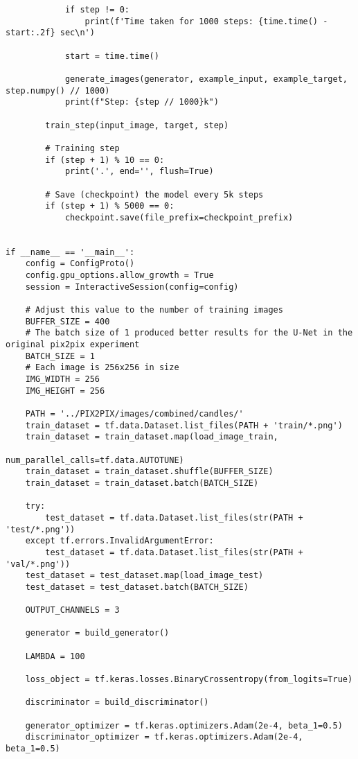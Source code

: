 \begin{lstlisting}
            if step != 0:
                print(f'Time taken for 1000 steps: {time.time() - start:.2f} sec\n')

            start = time.time()

            generate_images(generator, example_input, example_target, step.numpy() // 1000)
            print(f"Step: {step // 1000}k")

        train_step(input_image, target, step)

        # Training step
        if (step + 1) % 10 == 0:
            print('.', end='', flush=True)

        # Save (checkpoint) the model every 5k steps
        if (step + 1) % 5000 == 0:
            checkpoint.save(file_prefix=checkpoint_prefix)


if __name__ == '__main__':
    config = ConfigProto()
    config.gpu_options.allow_growth = True
    session = InteractiveSession(config=config)

    # Adjust this value to the number of training images
    BUFFER_SIZE = 400
    # The batch size of 1 produced better results for the U-Net in the original pix2pix experiment
    BATCH_SIZE = 1
    # Each image is 256x256 in size
    IMG_WIDTH = 256
    IMG_HEIGHT = 256

    PATH = '../PIX2PIX/images/combined/candles/'
    train_dataset = tf.data.Dataset.list_files(PATH + 'train/*.png')
    train_dataset = train_dataset.map(load_image_train,
                                      num_parallel_calls=tf.data.AUTOTUNE)
    train_dataset = train_dataset.shuffle(BUFFER_SIZE)
    train_dataset = train_dataset.batch(BATCH_SIZE)

    try:
        test_dataset = tf.data.Dataset.list_files(str(PATH + 'test/*.png'))
    except tf.errors.InvalidArgumentError:
        test_dataset = tf.data.Dataset.list_files(str(PATH + 'val/*.png'))
    test_dataset = test_dataset.map(load_image_test)
    test_dataset = test_dataset.batch(BATCH_SIZE)

    OUTPUT_CHANNELS = 3

    generator = build_generator()

    LAMBDA = 100

    loss_object = tf.keras.losses.BinaryCrossentropy(from_logits=True)

    discriminator = build_discriminator()

    generator_optimizer = tf.keras.optimizers.Adam(2e-4, beta_1=0.5)
    discriminator_optimizer = tf.keras.optimizers.Adam(2e-4, beta_1=0.5)


\end{lstlisting}
